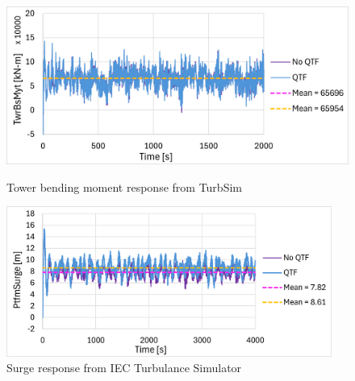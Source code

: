 \documentclass[a4paper, 11pt]{article}
\begin{document}
\begin{figure}[H]
    \begin{minipage}{0.48\textwidth}
        \centering
        \includegraphics[width=1\textwidth]{3.2_turb_twr.png}
        \caption{\small Tower bending moment response from TurbSim}
        \label{fig:3.2_turb_twr}
    \end{minipage}
    \hfill
    \begin{minipage}{0.5\textwidth}
        \centering
        \includegraphics[width=0.95\textwidth]{3.2_iec_surge.png}
        \caption{\small Surge response from IEC Turbulance Simulator}
        \label{fig:3.2_iec_surge}
    \end{minipage}
\end{figure}
\end{document}
